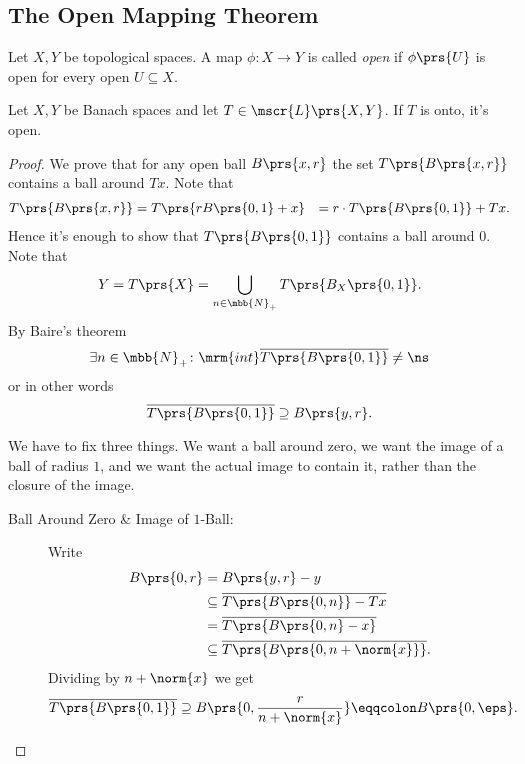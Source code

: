 \documentclass[10pt, twoside]{book}
\begin{document}

\subsection{The Open Mapping Theorem}

\begin{definition}
Let $X,Y$ be topological spaces. A map $\phi \colon X \to Y$ is called \emph{open} if $\phi\prs{U}$ is open for every open $U \subseteq X$.
\end{definition}

\begin{theorem}
Let $X,Y$ be Banach spaces and let $T \in \mscr{L}\prs{X,Y}$. If $T$ is onto, it's open.
\end{theorem}

\begin{proof}
We prove that for any open ball $B\prs{x,r}$ the set $T\prs{B\prs{x,r}}$ contains a ball around $Tx$.
Note that
\begin{align*}
T\prs{B\prs{x,r}} &= T\prs{r B\prs{0,1} + x}
&= r\cdot T\prs{B\prs{0,1}} + Tx \text{.}
\end{align*}
Hence it's enough to show that $T\prs{B\prs{0,1}}$ contains a ball around $0$.
Note that
\[Y = T\prs{X} = \bigcup_{n \in \mbb{N}_+} T\prs{B_X\prs{0,1}} \text{.}\]
By Baire's theorem
\[\exists n \in \mbb{N}_+ \colon \mrm{int} \overline{T\prs{B\prs{0,1}}} \neq \ns\]
or in other words
\[\overline{T\prs{B\prs{0,1}}} \supseteq B\prs{y,r} \text{.}\]

We have to fix three things. We want a ball around zero, we want the image of a ball of radius $1$, and we want the actual image to contain it, rather than the closure of the image.

\begin{description}
\item[Ball Around Zero \& Image of $1$-Ball:]
Write
\begin{align*}
B\prs{0,r} &= B\prs{y,r} - y
\\&\subseteq \overline{T\prs{B\prs{0,n}} - Tx}
\\&=
\overline{T\prs{B\prs{0,n} - x}}
\\&\subseteq
\overline{T\prs{B\prs{0,n+\norm{x}}}} \text{.}
\end{align*}
Dividing by $n + \norm{x}$ we get
\begin{align*}
\overline{T\prs{B\prs{0,1}}} \supseteq B\prs{0, \frac{r}{n + \norm{x}}} \eqqcolon B\prs{0,\eps} \text{.}
\end{align*}


\end{description}
\end{proof}
\end{document}

